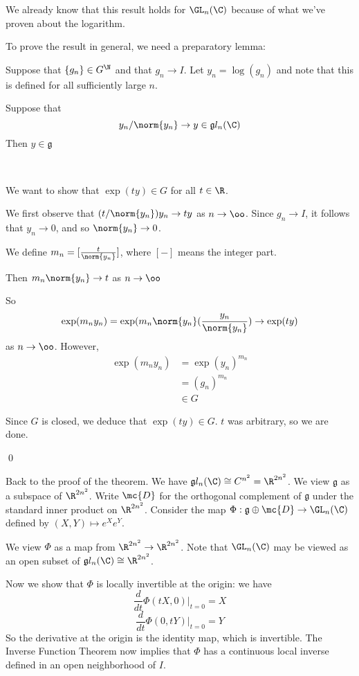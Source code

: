 \documentclass[x11names,reqno,14pt]{extarticle}
\newcommand{\mk}[1]{\mathfrak{#1}}
\newcommand{\g}{\mk{g}}
\newcommand{\dd}[2]{\frac{d#1}{d#2}}
\begin{document}
\proof

We already know that this result holds for $\GL_n(\C)$ because of what we've proven about the logarithm. 

To prove the result in general, we need a preparatory lemma:

\lem

Suppose that $\{g_n\}\in G^\N$ and that $g_n\to I$. Let $y_n = \log(g_n)$ and note that this is defined for all sufficiently large $n$. 

Suppose that 
\[
y_n/\norm{y_n} \to y \in \g l_n(\C)
\]
Then $y\in\g$

\proof
\,

We want to show that $\exp(ty)\in G$ for all $t \in \R$. 

We first observe that $(t/\norm{y_n})y_n\to ty$ as $n\to\oo$. Since $g_n \to I$, it follows that $y_n \to 0$, and so $\norm{y_n}\to0$. 

We define $m_n = [\frac{t}{\norm{y_n}}]$, where $[-]$ means the integer part. 

Then $m_n\norm{y_n} \to t$ as $n\to\oo$

So 
\[
\exp(m_ny_n) = \exp(m_n\norm{y_n}(\frac{y_n}{\norm{y_n}}) \to \exp(ty)
\]
as $n\to\oo$. However, 
\begin{align*}
\exp(m_ny_n) & = \exp(y_n)^{m_n} \\
& = (g_n)^{m_n} \\
& \in G
\end{align*}

Since $G$ is closed, we deduce that $\exp(ty) \in G$. $t$ was arbitrary, so we are done. 

\qed

Back to the proof of the theorem. We have $\g l_n(\C) \cong C^{n^2} = \R^{2n^2}$. We view $\g$ as a subspace of $\R^{2 n^2}$. Write $\mc{D}$ for the orthogonal complement of $\g$ under the standard inner product on $\R^{2n^2}$. Consider the map $\Phi:\g\oplus\mc{D} \to \GL_n(\C)$ defined by $(X, Y) \mapsto e^Xe^Y$. 

We view $\Phi$ as a map from $\R^{2n^2}\to\R^{2n^2}$. Note that $\GL_n(\C)$ may be viewed as an open subset of $\g l_n(\C) \cong \R^{2n^2}$.

Now we show that $\Phi$ is locally invertible at the origin: we have
\[
\dd{}{t}\Phi(tX, 0)|_{t=0} = X
\]
\[
\dd{}{t}\Phi(0, tY)|_{t=0} = Y
\]
So the derivative at the origin is the identity map, which is invertible. The Inverse Function Theorem now implies that $\Phi$ has a continuous local inverse defined in an open neighborhood of $I$. 
\end{document}
